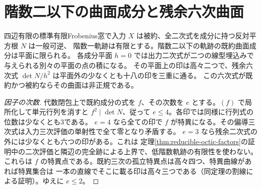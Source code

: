 \section{階数二以下の曲面成分と残余六次曲面}
\label{sec:low-rank-surface-factors}
\begin{theorem}\label{thm:low-rank-surface-factors}
四辺有限の標準有限Frobenius窓で入力 $X$ は被約、全二次式を成分に持つ反対平方根 $N$ は一般可逆、
階数一軌跡は有限とする。階数二以下の軌跡の既約曲面成分は平面に限られる。
各成分平面 $h=0$ では出力二次式が二つの線型埋込みで与えられる別々の平面の点の積になる。
その平面上の印は高々二つで、残余六次式 $\det N/h^2$ は平面外の少なくとも十八の印を三重に通る。
この六次式が既約かつ被約ならその曲面は非正規である。
\end{theorem}
\begin{proof}[因子の次数]
代数閉包上で既約成分の式を $f$、その次数を $e$ とする。$(f)$ で局所化して単元行列を消すと
$f^2\mid\det N$、従って $e\le4$。各印では同様に行列式の位数は少なくとも3である。
$e=4$ なら全ての印で $f$ が特異になる。その偏導三次式は入力三次評価の単射性で全て零となり矛盾する。
$e=3$ なら残余二次式の外には少なくとも六つの印がある。これは
定理\ref{thm:reducible-octic-factors}の証明中の二次評価と隣辺の完全跡による上界で、低階数軌跡の有限性を使わない。
これらは $f$ の特異点である。既約三次の孤立特異点は高々四つ、特異曲線があれば特異集合は
一本の直線でそこに載る印は高々三つである（同定理の割線による証明）。ゆえに $e\le2$。
\end{proof}
